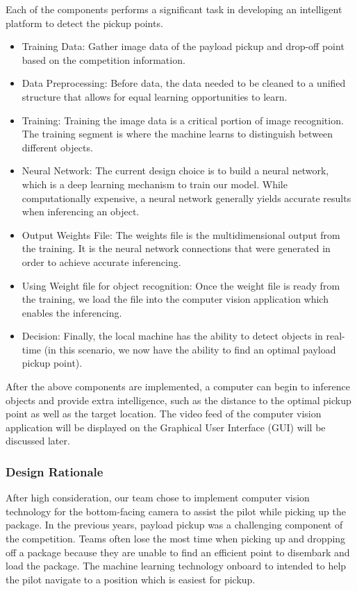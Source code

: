 \documentclass[onecolumn, oneside, letterpaper, draftclsnofoot, 10pt, compsoc]{IEEEtran}
\begin{document}
Each of the components performs a significant task in developing an intelligent platform to detect the pickup points.
\begin{itemize}
    \item Training Data: Gather image data of the payload pickup and drop-off point based on the competition information.
    \item Data Preprocessing: Before data, the data needed to be cleaned to a unified structure that allows for equal learning opportunities to learn.
    \item Training: Training the image data is a critical portion of image recognition. The training segment is where the machine learns to distinguish between different objects.
    \item Neural Network: The current design choice is to build a neural network, which is a deep learning mechanism to train our model. While computationally expensive, a neural network generally yields accurate results when inferencing an object.
    \item Output Weights File: The weights file is the multidimensional output from the training. It is the neural network connections that were generated in order to achieve accurate inferencing.
    \item Using Weight file for object recognition: Once the weight file is ready from the training, we load the file into the computer vision application which enables the inferencing.
    \item Decision: Finally, the local machine has the ability to detect objects in real-time (in this scenario, we now have the ability to find an optimal payload pickup point).
\end{itemize}

After the above components are implemented, a computer can begin to inference objects and provide extra intelligence, such as the distance to the optimal pickup point as well as the target location. The video feed of the computer vision application will be displayed on the Graphical User Interface (GUI) will be discussed later.

\subsubsection{Design Rationale}
After high consideration, our team chose to implement computer vision technology for the bottom-facing camera to assist the pilot while picking up the package. In the previous years, payload pickup was a challenging component of the competition. Teams often lose the most time when picking up and dropping off a package because they are unable to find an efficient point to disembark and load the package. The machine learning technology onboard to intended to help the pilot navigate to a position which is easiest for pickup. \\
\end{document}
